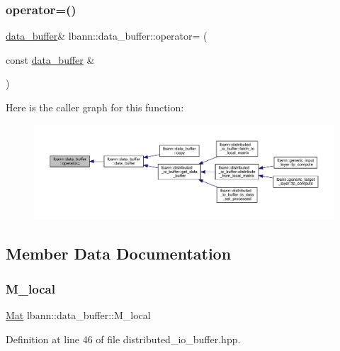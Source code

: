\subsubsection{\texorpdfstring{operator=()}{operator=()}}
{\footnotesize\ttfamily \hyperlink{classlbann_1_1data__buffer}{data\+\_\+buffer}\& lbann\+::data\+\_\+buffer\+::operator= (\begin{DoxyParamCaption}\item[{const \hyperlink{classlbann_1_1data__buffer}{data\+\_\+buffer} \&}]{ }\end{DoxyParamCaption})\hspace{0.3cm}{\ttfamily [default]}}

Here is the caller graph for this function\+:\nopagebreak
\begin{figure}[H]
\begin{center}
\leavevmode
\includegraphics[width=350pt]{classlbann_1_1data__buffer_a364283f9ce3d811ec73fc3c2513f11a6_icgraph}
\end{center}
\end{figure}


\subsection{Member Data Documentation}
\mbox{\label{classlbann_1_1data__buffer_a3d839e04fd26b5810027144662af0e54}} 
\subsubsection{\texorpdfstring{M\+\_\+local}{M\_local}}
{\footnotesize\ttfamily \hyperlink{base_8hpp_a68f11fdc31b62516cb310831bbe54d73}{Mat} lbann\+::data\+\_\+buffer\+::\+M\+\_\+local}



Definition at line 46 of file distributed\+\_\+io\+\_\+buffer.\+hpp.

